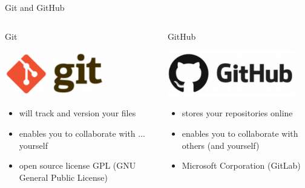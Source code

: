 \begin{frame}{Git and GitHub}
\begin{columns}
   \begin{block}{Git}
   \begin{center}
       \includegraphics[height=2cm]{shared/logo-git.png}
   \end{center}
   \begin{itemize}
       \item will track and version your files
       \item enables you to collaborate with ... yourself
       \item open source license GPL (GNU General Public License)
   \end{itemize}
\end{block}
 \begin{block}{GitHub}
 \begin{center}
      \includegraphics[height=2cm]{shared/logo-github.png}
 \end{center}
  \begin{itemize}
      \item stores your  repositories online
      \item enables you to collaborate with others (and yourself)
      \item Microsoft Corporation (GitLab)
  \end{itemize}
\end{block}
\end{columns}
\end{frame}